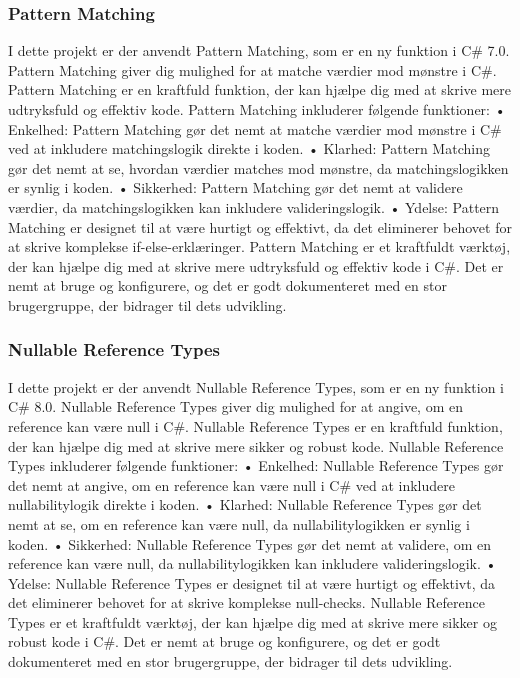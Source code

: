 \subsubsection{Pattern Matching}
I dette projekt er der anvendt Pattern Matching, som er en ny funktion i C\# 7.0. Pattern Matching giver dig mulighed for at matche værdier mod mønstre i C\#. Pattern Matching er en kraftfuld funktion, der kan hjælpe dig med at skrive mere udtryksfuld og effektiv kode.
Pattern Matching inkluderer følgende funktioner:
•	Enkelhed: Pattern Matching gør det nemt at matche værdier mod mønstre i C\# ved at inkludere matchingslogik direkte i koden.
•	Klarhed: Pattern Matching gør det nemt at se, hvordan værdier matches mod mønstre, da matchingslogikken er synlig i koden.
•	Sikkerhed: Pattern Matching gør det nemt at validere værdier, da matchingslogikken kan inkludere valideringslogik.
•	Ydelse: Pattern Matching er designet til at være hurtigt og effektivt, da det eliminerer behovet for at skrive komplekse if-else-erklæringer.
Pattern Matching er et kraftfuldt værktøj, der kan hjælpe dig med at skrive mere udtryksfuld og effektiv kode i C#. Det er nemt at bruge og konfigurere, og det er godt dokumenteret med en stor brugergruppe, der bidrager til dets udvikling.

\subsubsection{Nullable Reference Types}
I dette projekt er der anvendt Nullable Reference Types, som er en ny funktion i C\# 8.0. Nullable Reference Types giver dig mulighed for at angive, om en reference kan være null i C#. Nullable Reference Types er en kraftfuld funktion, der kan hjælpe dig med at skrive mere sikker og robust kode.
Nullable Reference Types inkluderer følgende funktioner:
•	Enkelhed: Nullable Reference Types gør det nemt at angive, om en reference kan være null i C# ved at inkludere nullabilitylogik direkte i koden.
•	Klarhed: Nullable Reference Types gør det nemt at se, om en reference kan være null, da nullabilitylogikken er synlig i koden.
•	Sikkerhed: Nullable Reference Types gør det nemt at validere, om en reference kan være null, da nullabilitylogikken kan inkludere valideringslogik.
•	Ydelse: Nullable Reference Types er designet til at være hurtigt og effektivt, da det eliminerer behovet for at skrive komplekse null-checks.
Nullable Reference Types er et kraftfuldt værktøj, der kan hjælpe dig med at skrive mere sikker og robust kode i C#. Det er nemt at bruge og konfigurere, og det er godt dokumenteret med en stor brugergruppe, der bidrager til dets udvikling.

